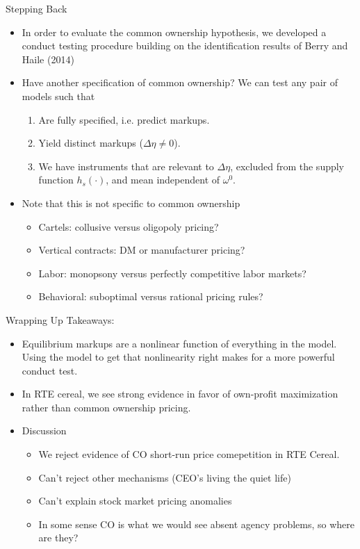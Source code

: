 \documentclass[handout, serif, aspectratio=169, 10pt]{beamer}
\begin{document}
\begin{frame}[plain]{Stepping Back}
\begin{itemize}
\item In order to evaluate the common ownership hypothesis, we developed a conduct testing procedure building on the identification results of Berry and Haile (2014)
\pause \item Have another specification of common ownership? We can test any pair of models such that
\begin{enumerate}
\item Are fully specified, i.e. predict markups.
\item Yield distinct markups ($\Delta\eta \neq 0$).
\item We have instruments that are relevant to $\Delta \eta$, excluded from the supply function $h_s(\cdot)$, and mean independent of $\omega^0$.
\end{enumerate}
\pause
\item Note that this is not specific to common ownership
\begin{itemize}
\item Cartels: collusive versus oligopoly pricing? 
\item Vertical contracts: DM  or manufacturer pricing?
\item Labor: monopsony versus perfectly competitive labor markets?
\item Behavioral: suboptimal versus rational pricing rules?
\end{itemize}
\end{itemize}
\end{frame}

\begin{frame}[plain]{Wrapping Up}
Takeaways:
\begin{itemize}
\item Equilibrium markups are a nonlinear function of everything in the model. Using the model to get that nonlinearity right makes for a more powerful conduct test.
\item In RTE cereal, we see strong evidence in favor of own-profit maximization rather than common ownership pricing.
\item Discussion
\begin{itemize}
    \item We reject evidence of CO short-run price comepetition in RTE Cereal.
    \item Can't reject other mechanisms (CEO's living the quiet life)
    \item Can't explain stock market pricing anomalies
    \item In some sense CO is what we would see absent agency problems, so where are they?
\end{itemize}
\end{itemize}
\end{frame}
\end{document}
